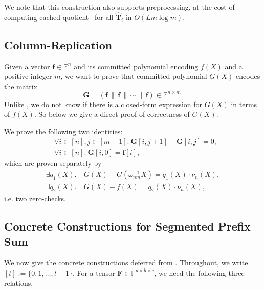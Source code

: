 We note that this construction also supports preprocessing,
  at the cost of computing cached quotient~\cite{cq22}
  for all $\widehat{\mathbf{T}}_i$ in $O(Lm\log m)$.

\subsection{Column-Replication}\label{app:replication}
Given a vector $\mathbf{f}\in\mathbb{F}^n$ and
  its committed polynomial encoding $f(X)$ and a positive integer $m$,
  we want to prove
  that committed polynomial $G(X)$ encodes the matrix
  \[
    \mathbf{G} = (\mathbf{f}\,\|\,\mathbf{f}\,\|\,\cdots\,\|\,\mathbf{f}) \in \mathbb{F}^{n\times m}.
  \]
  Unlike , we do not know if there
  is a closed-form expression for $G(X)$ in terms of $f(X)$.
  So below we give a direct proof of correctness of $G(X)$.

We prove the following two identities:
\begin{align}
    &\forall i\in[n], j\in[m-1].\ \mathbf{G}[i, j+1] - \mathbf{G}[i, j] = 0,\\
    &\forall i\in [n].\ \mathbf{G}[i, 0] = \mathbf{f}[i],
\end{align}
which are proven separately by
\begin{align}
  \exists q_1(X).&\
  G(X) - G(\omega_{nm}^{-1}X) = q_1(X)\cdot \nu_n(X),\\
  \exists q_2(X).&\
  G(X) - f(X) = q_2(X)\cdot \nu_n(X),
\end{align}
i.e. two zero-checks.

\subsection{Concrete Constructions for Segmented Prefix Sum}\label{app:prefix-sum}

We now give the concrete constructions deferred from
. Throughout, we write
$[t]:=\{0,1,\dots,t-1\}$.
For a tensor $\mathbf{F}\in\mathbb{F}^{a\times b\times c}$,
we need the following three relations.

